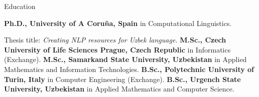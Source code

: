 \begin{rubric}{\faGraduationCap[solid] Education}

\entry*[2018 -- now]%
	\textbf{Ph.D., University of A Coruña, Spain} in Computational Linguistics.
	\par Thesis title: \emph{Creating NLP resources for Uzbek language.}
%
\entry*[2015 -- 2016]%
	\textbf{M.Sc., Czech University of Life Sciences Prague, Czech Republic} in Informatics (Exchange).
% 
\entry*[2014 -- 2017]%
	\textbf{M.Sc., Samarkand State University, Uzbekistan} in Applied Mathematics and Information Technologies.
%
\entry*[2012 -- 2013]%
	\textbf{B.Sc., Polytechnic University of Turin, Italy} in Computer Engineering (Exchange).
% 
\entry*[2009 -- 2014]%
	\textbf{B.Sc., Urgench State University, Uzbekistan} in Applied Mathematics and Computer Science.
% 
\end{rubric}